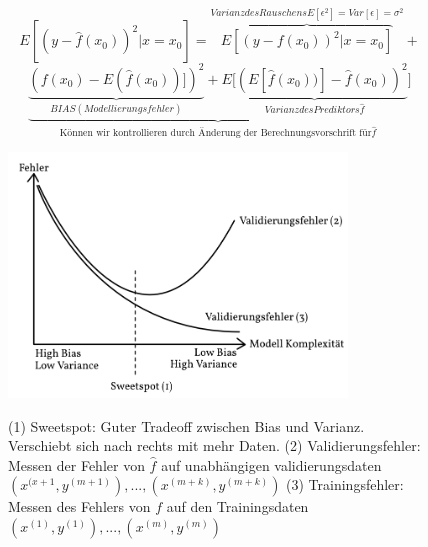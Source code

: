 $$E[(y-\hat{f}(x_0))^2 | x=x_0] = \overbrace{E [(y-f(x_0))^2 | x = x_0]}^{Varianz des Rauschens E[\epsilon^2]=Var[\epsilon]=\sigma^2} + $$
$$\underbrace{\underbrace{(f(x_0) - E(\hat{f}(x_0))])^2}_{BIAS (Modellierungsfehler)} + \underbrace{E[(E[\hat{f}(x_0))]-\hat{f}(x_0))^2}_{Varianz des Prediktors \hat{f}}}_{\text{Können wir kontrollieren durch Änderung der Berechnungsvorschrift für} \hat{f}}]$$


\begin{figure}[h]
\centering
\includegraphics[width=9cm]{graphs/graph.png}  
\label{Modell_Komplexität}
\caption{(1) Sweetspot: Guter Tradeoff zwischen Bias und Varianz. Verschiebt sich nach rechts mit mehr Daten.  (2) Validierungsfehler: Messen der Fehler von $\hat{f}$ auf unabhängigen validierungsdaten $(x^{(x+1},y^{(m+1)}),...,(x^{(m+k)},y^{(m+k)})$  (3) Trainingsfehler: Messen des Fehlers von $f$ auf den Trainingsdaten $(x^{(1)},y^{(1)}),...,(x^{(m)},y^{(m)})$}

\end{figure}
